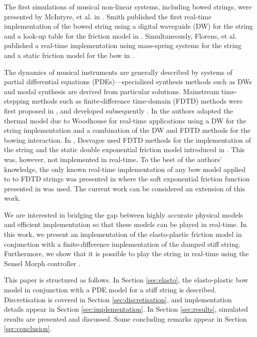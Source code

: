 \documentclass[twoside,a4paper,dvipsnames]{article}
\begin{document}
The first simulations of musical non-linear systems, including bowed strings, were presented by McIntyre, et al. in \cite{McIntyre1983}. Smith published the first real-time implementation of the bowed string using a digital waveguide (DW) for the string and a look-up table for the friction model in \cite{Smith1986}. Simultaneously, Florens, et al. published a real-time implementation using mass-spring systems for the string and a static friction model for the bow in \cite{Florens1986}. 

The dynamics of musical instruments are generally described by systems of  partial differential equations (PDEs)---specialised synthesis methods such as DWs \cite{Smith1992} and modal synthesis \cite{Morrison1993} are derived from particular solutions.  Mainstream time-stepping methods such as finite-difference time-domain (FDTD) methods were first proposed in \cite{Hiller, Hiller2, Chaigne}, and developed subsequently \cite{Bilbao2009, Bilbao2018}. In \cite{Maestre2014} the authors adapted the thermal model due to Woodhouse \cite{Woodhouse2003} for real-time applications using a DW for the string implementation and a combination of the DW and FDTD methods for the bowing interaction. In \cite{Desvages2017}, Desvages used FDTD methods for the implementation of the string and the static double exponential friction model introduced in \cite{Smith2000}. This was, however, not implemented in real-time. To the best of the authors' knowledge, the only known real-time implementation of any bow model applied to to FDTD strings was presented in \cite{Willemsen2019} where the soft exponential friction function presented in \cite{Bilbao2009} was used. The current work can be considered an extension of this work.

We are interested in bridging the gap between highly accurate physical models and efficient implementation so that these models can be played in real-time. In this work, we present an implementation of the elasto-plastic friction model in conjunction with a finite-difference implementation of the damped stiff string. Furthermore, we show that it is possible to play the string in real-time using the Sensel Morph controller \cite{Sensel2019}.

This paper is structured as follows. In Section \ref{sec:elasto}, the elasto-plastic bow model in conjunction with a PDE model for a stiff string is described. Discretisation is covered in Section \ref{sec:discretisation}, and implementation details appear in Section \ref{sec:implementation}. In Section \ref{sec:results}, simulated results are presented and discussed. Some concluding remarks appear in Section  \ref{sec:conclusion}.
\end{document}
